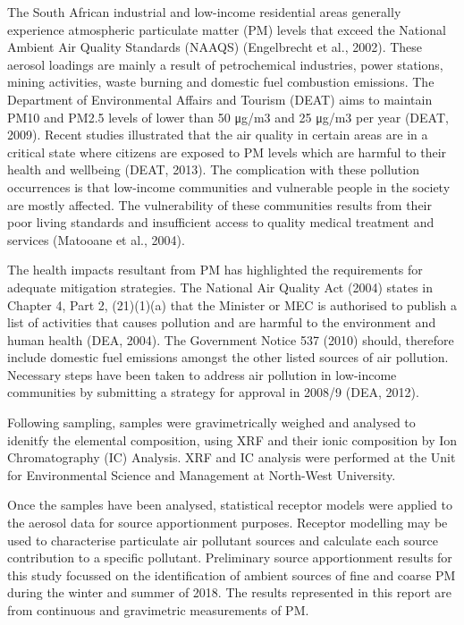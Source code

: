 \documentclass{nwureport}
\begin{document}
The South African industrial and low-income residential areas generally experience atmospheric particulate matter (PM) levels that exceed the National Ambient Air Quality Standards (NAAQS) (Engelbrecht et al., 2002). These aerosol loadings are mainly a result of petrochemical industries, power stations, mining activities, waste burning and domestic fuel combustion emissions. The Department of Environmental Affairs and Tourism (DEAT) aims to maintain PM10 and PM2.5 levels of lower than 50 μg/m3 and 25 μg/m3 per year (DEAT, 2009). Recent studies illustrated that the air quality in certain areas are in a critical state where citizens are exposed to PM levels which are harmful to their health and wellbeing (DEAT, 2013). The complication with these pollution occurrences is that low-income communities and vulnerable people in the society are mostly affected. The vulnerability of these communities results from their poor living standards and insufficient access to quality medical treatment and services (Matooane et al., 2004). 

The health impacts resultant from PM has highlighted the requirements for adequate mitigation strategies. The National Air Quality Act (2004) states in Chapter 4, Part 2, (21)(1)(a) that the Minister or MEC is authorised to publish a list of activities that causes pollution and are harmful to the environment and human health (DEA, 2004). The Government Notice 537 (2010) should, therefore include domestic fuel emissions amongst the other listed sources of air pollution. Necessary steps have been taken to address air pollution in low-income communities by submitting a strategy for approval in 2008/9 (DEA, 2012). 

Following sampling, samples were gravimetrically weighed and analysed to idenitfy the elemental composition, using XRF and their ionic composition by Ion Chromatography (IC) Analysis. XRF and IC analysis were performed at the Unit for Environmental Science and Management at North-West University.

Once the samples have been analysed, statistical receptor models were applied to the aerosol data for source apportionment purposes. Receptor modelling may be used to characterise particulate air pollutant sources and calculate each source contribution to a specific pollutant. Preliminary source apportionment results for this study focussed on the identification of ambient sources of fine and coarse PM during the winter and summer of 2018. The results represented in this report are from continuous and gravimetric measurements of PM. 
\end{document}
